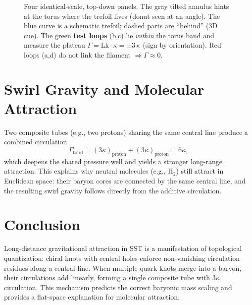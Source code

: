 \documentclass[reprint,aps,onecolumn,nofootinbib]{revtex4-2}
\begin{document}
\begin{figure}[t]
{%
}

\hspace{0.9cm}
\hspace{0.9cm}
\hspace{0.9cm}

\caption{Four identical-scale, top-down panels. The gray tilted annulus hints at the torus where the trefoil lives (donut seen at an angle).
The blue curve is a schematic trefoil; dashed parts are “behind” (3D cue).
The green \textbf{test loops} (b,c) lie \emph{within} the torus band and measure the plateau \(\Gamma=\mathrm{Lk}\cdot\kappa=\pm 3\,\kappa\) (sign by orientation).
Red loops (a,d) do not link the filament \(\Rightarrow \Gamma\approx 0\).}
\label{fig:fourpanel-3D-cartoon}
\end{figure}


\section{Swirl Gravity and Molecular Attraction}
Two composite tubes (e.g., two protons) sharing the same central line produce a combined circulation
\[
    \Gamma_{\mathrm{total}} = (3 \kappa)_{\mathrm{proton}} + (3 \kappa)_{\mathrm{proton}} = 6 \kappa,
\]
which deepens the shared pressure well and yields a stronger long-range attraction.
This explains why neutral molecules (e.g., H$_2$) still attract in Euclidean space: their baryon cores are connected by the same central line, and the resulting swirl gravity follows directly from the additive circulation.

\section{Conclusion}
Long-distance gravitational attraction in SST is a manifestation of topological quantization: chiral knots with central holes enforce non-vanishing circulation residues along a central line.
When multiple quark knots merge into a baryon, their circulations add linearly, forming a single composite tube with $3\kappa$ circulation.
This mechanism predicts the correct baryonic mass scaling and provides a flat-space explanation for molecular attraction.



\nocite{*}


\end{document}
